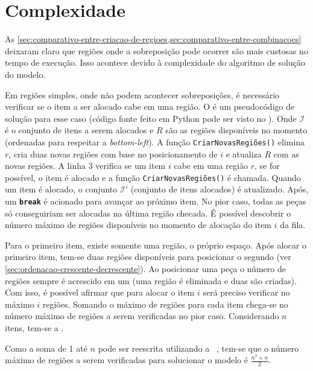 \section{Complexidade}\label{sec:complexidade}

As \cref{sec:comparativo-entre-criacao-de-regioes,sec:comparativo-entre-combinacoes} deixaram claro
que regiões onde a sobreposição pode ocorrer são mais custosas no tempo de execução.
Isso acontece devido à complexidade do algoritmo de solução do modelo.

Em regiões simples, onde não podem acontecer sobreposições, é necessário verificar se o item a ser
alocado cabe em uma região.
O  é um pseudocódigo de solução para esse caso (código fonte feito em
Python pode ser visto no ).
Onde $\mathcal{I}$ é o conjunto de itens a serem alocados e $R$ são as regiões disponíveis no
momento (ordenadas para respeitar a \textit{bottom-left}).
A função \texttt{CriarNovasRegiões()} elimina $r$, cria duas novas regiões com base no
posicionamento de $i$ e atualiza $R$ com as novas regiões.
A linha 3 verifica se um item $i$ cabe em uma região $r$, se for possível, o item é alocado e a
função \texttt{CriarNovasRegiões()} é chamada.
Quando um item é alocado, o conjunto $\mathcal{I'}$ (conjunto de itens alocados) é atualizado.
Após, um \texttt{\textbf{break}} é acionado para avançar ao próximo item.
No pior caso, todas as peças só conseguiriam ser alocadas na última região checada.
É possível descobrir o número máximo de regiões disponíveis no momento de alocação do item $i$ da
fila.



Para o primeiro item, existe somente uma região, o próprio espaço.
Após alocar o primeiro item, tem-se duas regiões disponíveis para posicionar o segundo (ver
\cref{sec:ordenacao-crescente-decrescente}).
Ao posicionar uma peça o número de regiões sempre é acrescido em um (uma região é eliminada e duas
são criadas).
Com isso, é possível afirmar que para alocar o item $i$ será preciso verificar no máximo $i$ regiões.
Somando o máximo de regiões para cada item chega-se no número máximo de regiões a serem verificadas
no pior caso.
Considerando $n$ itens, tem-se a .



Como a soma de 1 até $n$ pode ser reescrita utilizando a 
~\cite{merca2015alternative}, tem-se que o número máximo de regiões a serem verificadas
para solucionar o modelo é $\frac{n^2 + n}{2}$.


